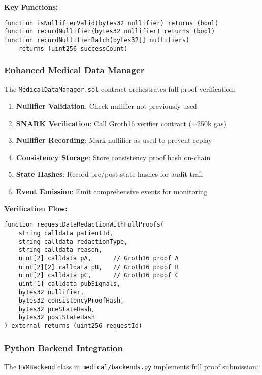 \textbf{Key Functions:}
\begin{verbatim}
function isNullifierValid(bytes32 nullifier) returns (bool)
function recordNullifier(bytes32 nullifier) returns (bool)
function recordNullifierBatch(bytes32[] nullifiers) 
    returns (uint256 successCount)
\end{verbatim}

\subsubsection{Enhanced Medical Data Manager}

The \texttt{MedicalDataManager.sol} contract orchestrates full proof verification:

\begin{enumerate}
    \item \textbf{Nullifier Validation}: Check nullifier not previously used
    \item \textbf{SNARK Verification}: Call Groth16 verifier contract ($\sim$250k gas)
    \item \textbf{Nullifier Recording}: Mark nullifier as used to prevent replay
    \item \textbf{Consistency Storage}: Store consistency proof hash on-chain
    \item \textbf{State Hashes}: Record pre/post-state hashes for audit trail
    \item \textbf{Event Emission}: Emit comprehensive events for monitoring
\end{enumerate}

\textbf{Verification Flow:}
\begin{verbatim}
function requestDataRedactionWithFullProofs(
    string calldata patientId,
    string calldata redactionType,
    string calldata reason,
    uint[2] calldata pA,      // Groth16 proof A
    uint[2][2] calldata pB,   // Groth16 proof B
    uint[2] calldata pC,      // Groth16 proof C
    uint[1] calldata pubSignals,
    bytes32 nullifier,
    bytes32 consistencyProofHash,
    bytes32 preStateHash,
    bytes32 postStateHash
) external returns (uint256 requestId)
\end{verbatim}

\subsubsection{Python Backend Integration}

The \texttt{EVMBackend} class in \texttt{medical/backends.py} implements full proof submission:

